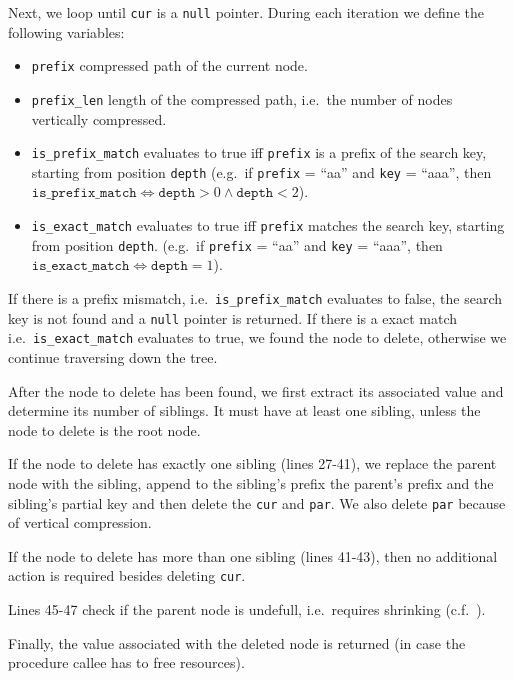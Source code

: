 \documentclass[abstracton,12pt]{scrartcl}
\theoremstyle{definition}
\begin{document}
Next, we loop until \texttt{cur} is a \texttt{null} pointer. During each
iteration we define the following variables:
\begin{itemize}
  \item \texttt{prefix} compressed path of the current node.
  \item \texttt{prefix\_len} length of the compressed path, i.e.\ the number
    of nodes vertically compressed.
  \item \texttt{is\_prefix\_match} evaluates to true iff \texttt{prefix} is a
    prefix of the search key, starting from position \texttt{depth}
    (e.g.\ if \texttt{prefix} = ``aa'' and \texttt{key} = ``aaa'', then
    $\texttt{is\_prefix\_match} \iff \texttt{depth} > 0 \land \texttt{depth} < 2$).
  \item \texttt{is\_exact\_match} evaluates to true iff \texttt{prefix} matches
    the search key, starting from position \texttt{depth}.
    (e.g.\ if \texttt{prefix} = ``aa'' and \texttt{key} = ``aaa'', then
    $\texttt{is\_exact\_match} \iff \texttt{depth} = 1$).
\end{itemize}

If there is a prefix mismatch, i.e.\ \texttt{is\_prefix\_match} evaluates to
false, the search key is not found and a \texttt{null} pointer is returned.
If there is a exact match i.e.\ \texttt{is\_exact\_match} evaluates to true,
we found the node to delete, otherwise we continue traversing down the tree.

After the node to delete has been found, we first extract its associated value
and determine its number of siblings. It must have at least one sibling, 
unless the node to delete is the root node.

If the node to delete has exactly one sibling (lines 27-41), we replace the 
parent node with the sibling, append to the sibling's prefix the parent's
prefix and the sibling's partial key and then delete the \texttt{cur} and
\texttt{par}. We also delete \texttt{par} because of vertical compression.

If the node to delete has more than one sibling (lines 41-43), then no additional action
is required besides deleting \texttt{cur}.

Lines 45-47 check if the parent node is undefull, i.e.\ requires shrinking
(c.f.\ ).

Finally, the value associated with the deleted node is returned (in case the
procedure callee has to free resources).
\end{document}
